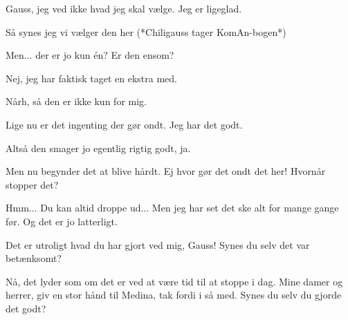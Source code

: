 \documentclass[a4paper,11pt]{article}
\begin{document}
\begin{sketch}
 Gauss, jeg ved ikke hvad jeg skal vælge. Jeg er ligeglad.

 Så synes jeg vi vælger den her (*Chiligauss tager KomAn-bogen*)

 Men... der er jo kun én? Er den ensom?

 Nej, jeg har faktisk taget en ekstra med.

 Nårh, så den er ikke kun for mig.


 Lige nu er det ingenting der gør ondt. Jeg har det godt.

 Altså den smager jo egentlig rigtig godt, ja.


 Men nu begynder det at blive hårdt. Ej hvor gør det ondt det her! Hvornår stopper det?

 Hmm... Du kan altid droppe ud... Men jeg har set det ske alt for mange gange før. Og det er jo latterligt.


 Det er utroligt hvad du har gjort ved mig, Gauss! Synes du selv det var betænksomt?

 Nå, det lyder som om det er ved at være tid til at stoppe i dag. Mine damer og herrer, giv en stor hånd til Medina, tak fordi i så med. Synes du selv du gjorde det godt?

\end{sketch}
\end{document}
